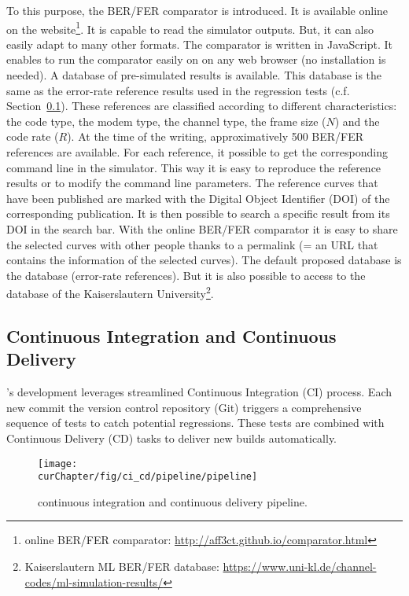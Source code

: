 To this purpose, the BER/FER comparator is introduced. It is available
online on the \AFFECT website\footnote{\AFFECT online BER/FER comparator:
\url{http://aff3ct.github.io/comparator.html}}. It is capable to read the
\AFFECT simulator outputs. But, it can also easily adapt to many other formats.
The comparator is written in JavaScript. It enables to run the comparator
easily on on any web browser (no installation is needed). A database of \AFFECT
pre-simulated results is available. This database is the same as the error-rate
reference results used in the regression tests (c.f.
Section~\ref{sec:aff3ct_ci_cd}). These references are classified according to
different characteristics: the code type, the modem type, the channel type,
the frame size ($N$) and the code rate ($R$). At the time of the writing,
approximatively 500 BER/FER references are available. For each reference, it
possible to get the corresponding command line in the \AFFECT simulator. This
way it is easy to reproduce the reference results or to modify the command line
parameters. The reference curves that have been published are marked with
the Digital Object Identifier (DOI) of the corresponding publication. It is then
possible to search a specific result from its DOI in the search bar. With the
online BER/FER comparator it is easy to share the selected curves with other
people thanks to a permalink (= an URL that contains the information of the
selected curves). The default proposed database is the \AFFECT database
(error-rate references). But it is also possible to access to the database of
the Kaiserslautern University\footnote{Kaiserslautern ML BER/FER database:
\url{https://www.uni-kl.de/channel-codes/ml-simulation-results/}}.

\subsection{Continuous Integration and Continuous Delivery}
\label{sec:aff3ct_ci_cd}

\AFFECT's development leverages streamlined Continuous Integration (CI) process.
Each new commit the version control repository (Git) triggers a comprehensive
sequence of tests to catch potential regressions. These tests are combined with
Continuous Delivery (CD) tasks to deliver new \AFFECT builds automatically.

\begin{figure}[htp]
  \centering
  \texttt{[image: \\curChapter/fig/ci\_cd/pipeline/pipeline]}
  \caption{\AFFECT continuous integration and continuous delivery pipeline.}
  \label{fig:aff3ct_ci_cd_pipeline}
\end{figure}

